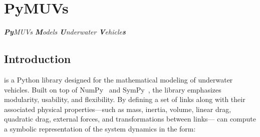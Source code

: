 \chapter{PyMUVs}
\emph{\textbf{Py}MUVs \textbf{M}odels \textbf{U}nderwater \textbf{V}ehicle\textbf{s}}

\section{Introduction}

\iffalse
\pymuvs{ }is a Python library for mathematically modelling underwater vehicles. The
library is designed to be modular and easy to use, and is built on top of NumPy
\cite{numpy} and SymPy \cite{sympy}. By defining the a set of links, as well as
their properties, such as mass, inertia, volume, linear drag, quadratic drag,
external forces, and transformations between links,
\pymuvs{ }can compute a symbolic representation of the system on the
form
\begin{align}
    \bm{M}(\bm{q}) \ddot{\bm{q}} + \bm{C}(\bm{q}, \dot{\bm{q}}) \dot{\bm{q}} +
    \bm{D}(\bm{q}, \dot{\bm{q}}) \dot{\bm{q}} + \bm{g}(\bm{q}) = \bm{J}^T(\bm{q}) \bm{B} \bm{u},
    \label{eq:pymuvs:eom}
\end{align}
where the matrices $\bm{M}$, $\bm{C}$, $\bm{D}$, $\bm{g}$, $\bm{J}$, and $\bm{B}$ are
computed symbolically and can be used to simulate the system. This is especially
useful when implementing model-based controllers that require the dynamics of the
system to be on the form of, or similar to \autoref{eq:pymuvs:eom}. The library
also supports exporting the symbolic representation, and the whole model to C++
code, which can be used in real-time simulations or for significantly faster
simulations.
The library, written in Python, allows for quick and easy prototyping of
models, with the flexibility to add or remove links and transformations.
The library is open-source and can be found at
\url{https://github.com/haakonbaa/pymuvs}. 
\fi

\pymuvs{} is a Python library designed for the mathematical modeling of 
underwater vehicles. Built on top of NumPy~\cite{numpy} and SymPy~\cite{sympy}, 
the library emphasizes modularity, usability, and flexibility. By defining a 
set of links along with their associated physical properties—such as mass, 
inertia, volume, linear drag, quadratic drag, external forces, and 
transformations between links—\pymuvs{} can compute a symbolic representation 
of the system dynamics in the form:


